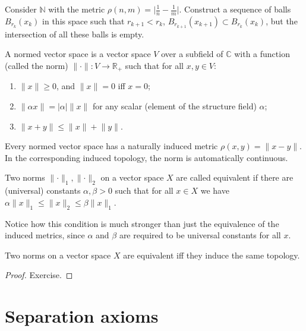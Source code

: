 \begin{xca}
    Consider $\mathbb{N}$ with the metric $\rho (n,m)=\lvert \frac 1 n-\frac 1 m\rvert$. Construct a sequence of balls $B_{r_k}(x_k)$ in this space such that $r_{k+1}<r_k$, $B_{r_{k+1}}(x_{k+1})\subset B_{r_k}(x_k)$, but the intersection of all these balls is empty.
\end{xca}
\begin{defn}
    A normed vector space is a vector space $V$ over a subfield of $\mathbb{C}$ with a function (called the norm) $\lVert \cdot \rVert: V\to \mathbb{R}_+$ such that for all $x,y\in V$:
    \begin{enumerate}
        \item $\lVert x\rVert\geq 0$, and $\lVert x\rVert= 0$ iff $x=0$;
        \item $\lVert \alpha  x\rVert=\lvert \alpha \rvert \lVert x\rVert$ for any scalar (element of the structure field) $\alpha$;
        \item $\lVert x+y\rVert\leq \lVert x\rVert+\lVert y\rVert$.
    \end{enumerate}
    Every normed vector space has a naturally induced metric $\rho (x,y)=\lVert x-y\rVert$. In the corresponding induced topology, the norm is automatically continuous.
\end{defn}
\begin{defn}
    Two norms $\lVert\cdot \rVert_1,\lVert\cdot \rVert_2 $ on a vector space $X$ are called equivalent if there are (universal) constants $\alpha,\beta >0$ such that for all $x\in X$ we have $\alpha \lVert x \rVert_1\leq \lVert x \rVert_2 \leq \beta \lVert x \rVert_1$.
\end{defn}
Notice how this condition is much stronger than just the equivalence of the induced metrics, since $\alpha$ and $\beta$ are required to be universal constants for all $x$.

\begin{thm}
    Two norms on a vector space $X$ are equivalent iff they induce the same topology.
\end{thm}
\begin{proof}
    Exercise.
\end{proof}






\section{Separation axioms} \label{Separation Axioms}

